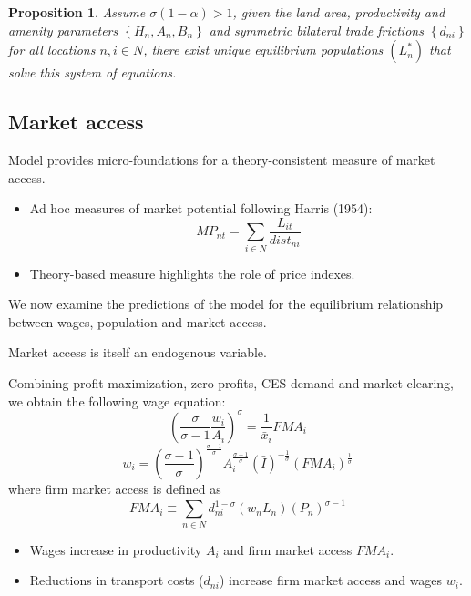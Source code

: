 \documentclass[11pt,a4paper]{article}
\newtheorem{pros}{Proposition}
\begin{document}
\begin{pros}
Assume $\sigma (1-\alpha )>1$, given the land area, productivity and amenity parameters $\left\{ H_n,A_n,B_n \right\}$ and symmetric bilateral trade frictions $\left\{ d_{ni} \right\}$ for all locations $n,i \in N$, there exist unique equilibrium populations $(L_n^*)$ that solve this system of equations. 
\end{pros}

\subsection{Market access}
Model provides micro-foundations for a theory-consistent measure of market access. 
\begin{itemize}
  \item Ad hoc measures of market potential following Harris (1954): $$ MP _{nt} = \sum_{i \in N}^{} \frac{L_{it}}{dist_{ni}} $$ 
  \item Theory-based measure highlights the role of price indexes. 
\end{itemize}
We now examine the predictions of the model for the equilibrium relationship between wages, population and market access. 

Market access is itself an endogenous variable. 

Combining profit maximization, zero profits, CES demand and market clearing, we obtain the following wage equation:
$$ \left( \frac{\sigma }{\sigma -1} \frac{w_i}{A_i}\right)^\sigma = \frac{1}{\bar{x}_i} FMA_i $$
\begin{equation}
  w_i = \left( \frac{\sigma -1}{\sigma } \right)^{\frac{\sigma -1}{\sigma }} A_i^{\frac{\sigma -1}{\sigma }} (\bar{I})^{-\frac{1}{\sigma }} (FMA_i)^{\frac{1}{\sigma }}
\end{equation}
where firm market access is defined as $$ FMA_i \equiv \sum_{n \in N}^{} d_{ni}^{1-\sigma } (w_n L_n)(P_n)^{\sigma -1} $$
\begin{itemize}
  \item Wages increase in productivity $A_i$ and firm market access $FMA_i$. 
  \item Reductions in transport costs ($d_{ni}$) increase firm market access and wages $w_i$. 
\end{itemize}
\end{document}
